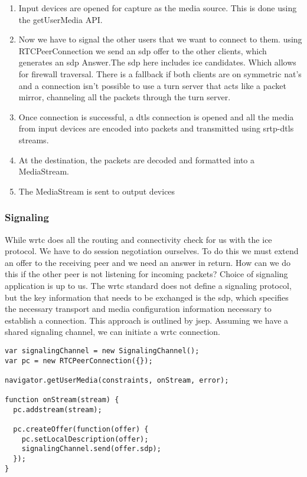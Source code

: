 \begin{enumerate}
\item Input devices are opened for capture as the media source. This is done using the getUserMedia API.
\item Now we have to signal the other users that we want to connect to them. using RTCPeerConnection we send an \gls{sdp} offer to the other clients, which generates an \gls{sdp} Answer.The \gls{sdp} here includes \gls{ice} candidates. Which allows for firewall traversal. There is a fallback if both clients are on symmetric \gls{nat}'s and a connection isn't possible to use a \gls{turn} server that acts like a packet mirror, channeling all the packets through the \gls{turn} server.
\item Once connection is successful, a \gls{dtls} connection is opened and all the media from input devices are encoded into packets and transmitted using \gls{srtp}-\gls{dtls} streams.
\item At the destination, the packets are decoded and formatted into a MediaStream.
\item The MediaStream is sent to output devices
\end{enumerate}


\subsubsection{Signaling}
While \gls{wrtc} does all the routing and connectivity check for us with the \gls{ice} protocol. We have to do session negotiation ourselves. To do this we must extend an offer to the receiving peer and we need an answer in return. How can we do this if the other peer is not listening for incoming packets? Choice of signaling application is up to us. The \gls{wrtc} standard does not define a signaling protocol, but the key information that needs to be exchanged is the \gls{sdp}, which specifies the necessary transport and media configuration information necessary to establish a connection. This approach is outlined by \gls{jsep}. Assuming we have a shared signaling channel, we can initiate a \gls{wrtc} connection.

\begin{lstlisting}
var signalingChannel = new SignalingChannel();
var pc = new RTCPeerConnection({});

navigator.getUserMedia(constraints, onStream, error);

function onStream(stream) {
  pc.addstream(stream);

  pc.createOffer(function(offer) {
    pc.setLocalDescription(offer);
    signalingChannel.send(offer.sdp);
  });
}
\end{lstlisting}


